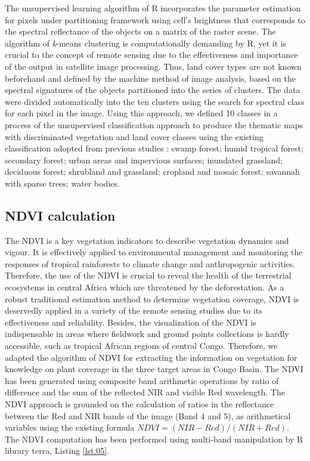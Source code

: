 \documentclass[applsci,article,submit,pdftex,moreauthors]{Definitions/mdpi}
\begin{document}
The unsupervised learning algorithm of R incorporates the parameter estimation for pixels under partitioning framework using cell's brightness that corresponds to the spectral reflectance of the objects on a matrix of the raster scene. The algorithm of \emph{k}-means clustering is computationally demanding by R, yet it is crucial to the concept of remote sensing due to the effectiveness and importance of the output in satellite image processing. Thus, land cover types are not known beforehand and defined by the machine method of image analysis, based on the spectral signatures of the objects partitioned into the series of clusters. The data were divided automatically into the ten clusters using the search for spectral class for each pixel in the image. 
Using this approach, we defined 10 classes in a process of the unsupervised classification approach to produce the thematic maps with discriminated vegetation and land cover classes using the existing classification adopted from previous studies \cite{Bwangoy}: swamp forest; humid tropical forest; secondary forest; urban areas and impervious surfaces; inundated grassland; deciduous forest; shrubland and grassland; cropland and mosaic forest; savannah with sparse trees; water bodies. 

\subsection{NDVI calculation}
The NDVI is a key vegetation indicators to describe vegetation dynamics and vigour. It is effectively applied to environmental management and monitoring the responses of tropical rainforests to climate change and anthropogenic activities. Therefore, the use of the NDVI is crucial to reveal the health of the terrestrial ecosystems in central Africa which are threatened by the deforestation. As a robust traditional estimation method to determine vegetation coverage, NDVI is deservedly applied in a variety of the remote sensing studies due to its effectiveness and reliability. Besides, the visualization of the NDVI is indispensable in areas where fieldwork and ground points collections is hardly accessible, such as tropical African regions of central Congo. Therefore, we adapted the algorithm of NDVI for extracting the information on vegetation for knowledge on plant coverage in the three target areas in Congo Basin. The NDVI has been generated using composite band arithmetic operations by ratio of difference and the sum of the reflected NIR and visible Red wavelength. The NDVI approach is grounded on the calculation of ratios in the reflectance between the Red and NIR bands of the image (Band 4 and 5), as arithmetical variables using the existing formula $NDVI=(NIR-Red)/(NIR+Red)$. The NDVI computation has been performed using multi-band manipulation by R library terra, Listing \ref{lst:05}. 
\end{document}
